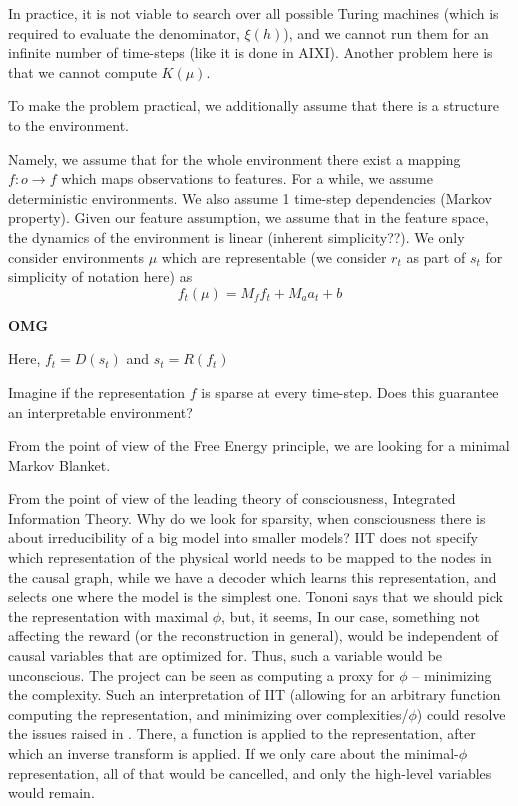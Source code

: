\documentclass[a4paper,11pt,oneside]{report}
\begin{document}
In practice, it is not viable to search over all possible Turing machines (which is required to evaluate the denominator, $\xi(h)$), and we cannot run them for an infinite number of time-steps (like it is done in AIXI). Another problem here is that we cannot compute $K(\mu)$.

To make the problem practical, we additionally assume that there is a structure to the environment.

Namely, we assume that for the whole environment there exist a mapping $f\colon o\to f$ which maps observations to features. For a while, we assume deterministic environments. We also assume 1 time-step dependencies (Markov property). Given our feature assumption, we assume that in the feature space, the dynamics of the environment is linear (inherent simplicity??). We only consider environments $\mu$ which are representable (we consider $r_t$ as part of $s_t$ for simplicity of notation here) as
$$
f_t(\mu)=M_ff_t+M_aa_t+b
$$

{\bf OMG}





Here, $f_t=D(s_t)$ and $s_t=R(f_t)$

Imagine if the representation $f$ is sparse at every time-step. Does this guarantee an interpretable environment?

From the point of view of the Free Energy principle, we are looking for a minimal Markov Blanket.

From the point of view of the leading theory of consciousness, Integrated Information Theory. Why do we look for sparsity, when consciousness there is about irreducibility of a big model into smaller models? IIT does not specify which representation of the physical world needs to be mapped to the nodes in the causal graph, while we have a decoder which learns this representation, and selects one where the model is the simplest one. Tononi says that we should pick the representation with maximal $\phi$, but, it seems, In our case, something not affecting the reward (or the reconstruction in general), would be independent of causal variables that are optimized for. Thus, such a variable would be unconscious. The project can be seen as computing a proxy for $\phi$ -- minimizing the complexity. Such an interpretation of IIT (allowing for an arbitrary function computing the representation, and minimizing over complexities/$\phi$) could resolve the issues raised in \cite{doerig2019unfolding}. There, a function is applied to the representation, after which an inverse transform is applied. If we only care about the minimal-$\phi$ representation, all of that would be cancelled, and only the high-level variables would remain.
\end{document}
